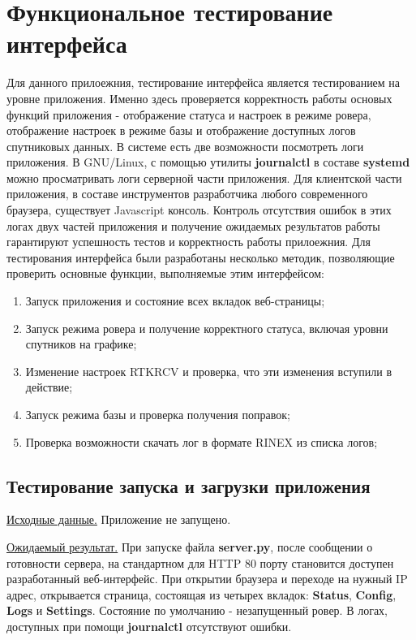 \section{Функциональное тестирование интерфейса} \label{sect4_2}

Для данного прилоежния, тестирование интерфейса является тестированием на уровне приложения. Именно здесь проверяется корректность работы основых функций приложения - отображение статуса и настроек в режиме ровера, отображение настроек в режиме базы и отображение доступных логов спутниковых данных. В системе есть две возможности посмотреть логи приложения. В GNU/Linux, с помощью утилиты \textbf{journalctl} в составе \textbf{systemd} можно просматривать логи серверной части приложения. Для клиентской части приложения, в составе инструментов разработчика любого современного браузера, существует Javascript консоль. Контроль отсутствия ошибок в этих логах двух частей приложения и получение ожидаемых результатов работы гарантируют успешность тестов и корректность работы прилоежния. Для тестирования интерфейса были разработаны несколько методик, позволяющие проверить основные функции, выполняемые этим интерфейсом:

\begin{enumerate}
  \item Запуск приложения и состояние всех вкладок веб-страницы;
  \item Запуск режима ровера и получение корректного статуса, включая уровни спутников на графике;
  \item Изменение настроек RTKRCV и проверка, что эти изменения вступили в действие;
  \item Запуск режима базы и проверка получения поправок;
  \item Проверка возможности скачать лог в формате RINEX из списка логов;
\end{enumerate}

\subsection{Тестирование запуска и загрузки приложения} \label{subsect4_2_1}

\underline{Исходные данные.} Приложение не запущено.

\underline{Ожидаемый результат.} При запуске файла \textbf{server.py}, после сообщении о готовности сервера, на стандартном для HTTP 80 порту становится доступен разработанный веб-интерфейс. При открытии браузера и переходе на нужный IP адрес, открывается страница, состоящая из четырех вкладок: \textbf{Status}, \textbf{Config}, \textbf{Logs} и \textbf{Settings}. Состояние по умолчанию - незапущенный ровер. В логах, доступных при помощи \textbf{journalctl} отсутствуют ошибки.

